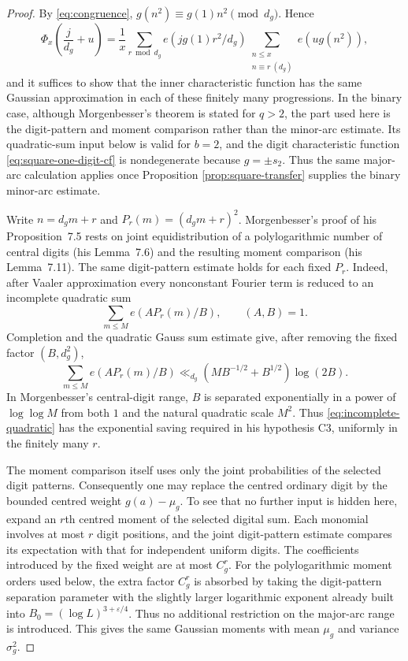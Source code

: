 \documentclass[11pt,reqno]{amsart}
\theoremstyle{plain}
\theoremstyle{definition}
\newcommand{\eps}{\varepsilon}
\newcommand{\ee}[1]{e\!\left(#1\right)}
\newcommand{\1}{\mathbf 1}
\begin{document}
\begin{proof}
By \eqref{eq:congruence},
$g(n^2)\equiv g(1)n^2\pmod{d_g}$.  Hence
\begin{equation}\label{eq:square-progression-split}
 \Phi_x\left(\frac j{d_g}+u\right)
 =\frac1x\sum_{r\bmod d_g}\ee{jg(1)r^2/d_g}
 \sum_{\substack{n\le x\\n\equiv r\ (d_g)}}\ee{u g(n^2)},
\end{equation}
and it suffices to show that the inner characteristic function has the same Gaussian approximation in each of these finitely many progressions.  In the binary case, although Morgenbesser's theorem is stated for $q>2$, the part used here is the digit-pattern and moment comparison rather than the minor-arc estimate.  Its quadratic-sum input below is valid for $b=2$, and the digit characteristic function \eqref{eq:square-one-digit-cf} is nondegenerate because $g=\pm s_2$.  Thus the same major-arc calculation applies once Proposition \ref{prop:square-transfer} supplies the binary minor-arc estimate.

Write $n=d_gm+r$ and $P_r(m)=(d_gm+r)^2$.  Morgenbesser's proof of his Proposition~7.5 \cite{morgenbesser} rests on joint equidistribution of a polylogarithmic number of central digits (his Lemma~7.6) and the resulting moment comparison (his Lemma~7.11).  The same digit-pattern estimate holds for each fixed $P_r$.  Indeed, after Vaaler approximation every nonconstant Fourier term is reduced to an incomplete quadratic sum
\[
 \sum_{m\le M}\ee{A P_r(m)/B},\qquad (A,B)=1.
\]
Completion and the quadratic Gauss sum estimate give, after removing the fixed factor $(B,d_g^2)$,
\begin{equation}\label{eq:incomplete-quadratic}
 \sum_{m\le M}\ee{A P_r(m)/B}
 \ll_{d_g}(MB^{-1/2}+B^{1/2})\log(2B).
\end{equation}
In Morgenbesser's central-digit range, $B$ is separated exponentially in a power of $\log\log M$ from both $1$ and the natural quadratic scale $M^2$.  Thus \eqref{eq:incomplete-quadratic} has the exponential saving required in his hypothesis C3, uniformly in the finitely many $r$.

The moment comparison itself uses only the joint probabilities of the selected digit patterns.  Consequently one may replace the centred ordinary digit by the bounded centred weight $g(a)-\mu_g$.  To see that no further input is hidden here, expand an $r$th centred moment of the selected digital sum.  Each monomial involves at most $r$ digit positions, and the joint digit-pattern estimate compares its expectation with that for independent uniform digits.  The coefficients introduced by the fixed weight are at most $C_g^r$.  For the polylogarithmic moment orders used below, the extra factor $C_g^r$ is absorbed by taking the digit-pattern separation parameter with the slightly larger logarithmic exponent already built into $B_0=(\log L)^{3+\eps/4}$.  Thus no additional restriction on the major-arc range is introduced.  This gives the same Gaussian moments with mean $\mu_g$ and variance $\sigma_g^2$.


\end{proof}
\end{document}
